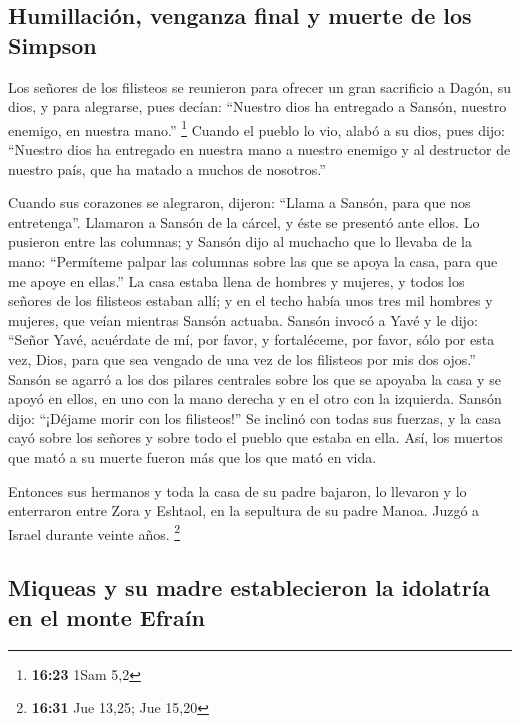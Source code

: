 \hypertarget{humillaciuxf3n-venganza-final-y-muerte-de-los-simpson}{%
\subsection{Humillación, venganza final y muerte de los
Simpson}\label{humillaciuxf3n-venganza-final-y-muerte-de-los-simpson}}

 Los señores de los filisteos se reunieron para ofrecer
un gran sacrificio a Dagón, su dios, y para alegrarse, pues decían:
``Nuestro dios ha entregado a Sansón, nuestro enemigo, en nuestra
mano.'' \footnote{\textbf{16:23} 1Sam 5,2}  Cuando el
pueblo lo vio, alabó a su dios, pues dijo: ``Nuestro dios ha entregado
en nuestra mano a nuestro enemigo y al destructor de nuestro país, que
ha matado a muchos de nosotros.''

 Cuando sus corazones se alegraron, dijeron: ``Llama a
Sansón, para que nos entretenga''. Llamaron a Sansón de la cárcel, y
éste se presentó ante ellos. Lo pusieron entre las columnas;
 y Sansón dijo al muchacho que lo llevaba de la mano:
``Permíteme palpar las columnas sobre las que se apoya la casa, para que
me apoye en ellas.''  La casa estaba llena de hombres y
mujeres, y todos los señores de los filisteos estaban allí; y en el
techo había unos tres mil hombres y mujeres, que veían mientras Sansón
actuaba.  Sansón invocó a Yavé y le dijo: ``Señor Yavé,
acuérdate de mí, por favor, y fortaléceme, por favor, sólo por esta vez,
Dios, para que sea vengado de una vez de los filisteos por mis dos
ojos.''  Sansón se agarró a los dos pilares centrales
sobre los que se apoyaba la casa y se apoyó en ellos, en uno con la mano
derecha y en el otro con la izquierda.  Sansón dijo:
``¡Déjame morir con los filisteos!'' Se inclinó con todas sus fuerzas, y
la casa cayó sobre los señores y sobre todo el pueblo que estaba en
ella. Así, los muertos que mató a su muerte fueron más que los que mató
en vida.

 Entonces sus hermanos y toda la casa de su padre
bajaron, lo llevaron y lo enterraron entre Zora y Eshtaol, en la
sepultura de su padre Manoa. Juzgó a Israel durante veinte años.
\footnote{\textbf{16:31} Jue 13,25; Jue 15,20}

\hypertarget{miqueas-y-su-madre-establecieron-la-idolatruxeda-en-el-monte-efrauxedn}{%
\subsection{Miqueas y su madre establecieron la idolatría en el monte
Efraín}\label{miqueas-y-su-madre-establecieron-la-idolatruxeda-en-el-monte-efrauxedn}}

